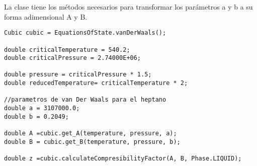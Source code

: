 La clase tiene los métodos necesarios para transformar los parámetros a y b a su forma adimensional A y B.

\begin{lstlisting}[label=se,caption=Solución de la ecuación de estado cúbica en la clase Cubic]
Cubic cubic = EquationsOfState.vanDerWaals();
		
double criticalTemperature = 540.2;
double criticalPressure = 2.74000E+06;

double pressure = criticalPressure * 1.5;
double reducedTemperature= criticalTemperature * 2;

//parametros de van Der Waals para el heptano
double a = 3107000.0;
double b = 0.2049;

double A =cubic.get_A(temperature, pressure, a);
double B = cubic.get_B(temperature, pressure, b);

double z =cubic.calculateCompresibilityFactor(A, B, Phase.LIQUID);
\end{lstlisting}




